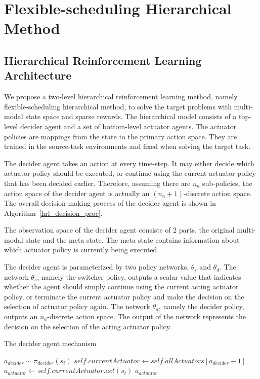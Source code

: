 \section{Flexible-scheduling Hierarchical Method}
\subsection{Hierarchical Reinforcement Learning Architecture}
We propose a two-level hierarchical reinforcement learning method, namely flexible-scheduling hierarchical method, to solve the target problems with multi-modal state space and sparse rewards. The hierarchical model consists of a top-level decider agent and a set of bottom-level actuator agents. The actuator policies are mappings from the state to the primary action space. They are trained in the source-task environments and fixed when solving the target task.

The decider agent takes an action at every time-step. It may either decide which actuator-policy should be executed, or continue using the current actuator policy that has been decided earlier. Therefore, assuming there are $n_a$ sub-policies, the action space of the decider agent is actually an $(n_a+1)$-discrete action space. The overall decision-making process of the decider agent is shown in Algorithm~\ref{hrl_decision_proc}.

The observation space of the decider agent consists of 2 parts, the original multi-modal state and the meta state. The meta state contains information about which actuator policy is currently being executed.

The decider agent is parameterized by two policy networks, $\theta_s$ and $\theta_d$. The network $\theta_s$, namely the switcher policy, outputs a scalar value that indicates whether the agent should simply continue using the current acting actuator policy, or terminate the current actuator policy and make the decision on the selection of actuator policy again. 
The network $\theta_d$, namely the decider policy, outputs an $n_a$-discrete action space. The output of the network represents the decision on the selection of the acting actuator policy. 



\begin{algorithm}
\caption{The decider agent mechanism}\label{hrl_decision_proc}
\begin{algorithmic}%
\State $a_{decider} \sim \pi_{decider}(s_t)$
 \State $self.currentActuator \gets self.allA
ctuators[a_{decider}-1]$
 \EndIf
\State $a_{actuator} \gets self.currentActuator.act(s_t)$
\State \Return $a_{actuator}$
\EndFunction
\end{algorithmic}
\end{algorithm}


